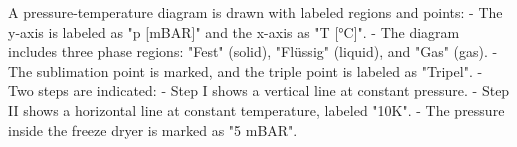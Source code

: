 A pressure-temperature diagram is drawn with labeled regions and points:  
- The y-axis is labeled as "p [mBAR]" and the x-axis as "T [°C]".  
- The diagram includes three phase regions: "Fest" (solid), "Flüssig" (liquid), and "Gas" (gas).  
- The sublimation point is marked, and the triple point is labeled as "Tripel".  
- Two steps are indicated:  
  - Step I shows a vertical line at constant pressure.  
  - Step II shows a horizontal line at constant temperature, labeled "10K".  
- The pressure inside the freeze dryer is marked as "5 mBAR".